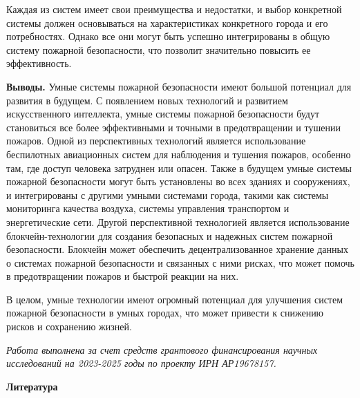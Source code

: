 \begin{multicols}{2}

Каждая из систем имеет свои преимущества и недостатки, и выбор
конкретной системы должен основываться на характеристиках конкретного
города и его потребностях. Однако все они могут быть успешно
интегрированы в общую систему пожарной безопасности, что позволит
значительно повысить ее эффективность.

{\bfseries Выводы.} Умные системы пожарной безопасности имеют большой
потенциал для развития в будущем. С появлением новых технологий и
развитием искусственного интеллекта, умные системы пожарной безопасности
будут становиться все более эффективными и точными в предотвращении и
тушении пожаров. Одной из перспективных технологий является
использование беспилотных авиационных систем для наблюдения и тушения
пожаров, особенно там, где доступ человека затруднен или опасен. Также в
будущем умные системы пожарной безопасности могут быть установлены во
всех зданиях и сооружениях, и интегрированы с другими умными системами
города, такими как системы мониторинга качества воздуха, системы
управления транспортом и энергетические сети. Другой перспективной
технологией является использование блокчейн-технологии для создания
безопасных и надежных систем пожарной безопасности. Блокчейн может
обеспечить децентрализованное хранение данных о системах пожарной
безопасности и связанных с ними рисках, что может помочь в
предотвращении пожаров и быстрой реакции на них.

В целом, умные технологии имеют огромный потенциал для улучшения систем
пожарной безопасности в умных городах, что может привести к снижению
рисков и сохранению жизней.
\end{multicols}

\emph{Работа выполнена за счет средств грантового финансирования научных
исследований на 2023-2025 годы по проекту ИРН АР19678157.}

\begin{center}
{\bfseries Литература}
\end{center}

